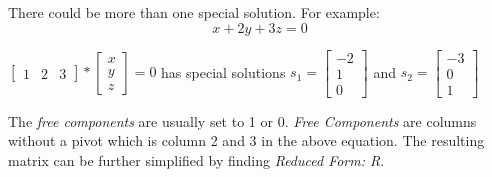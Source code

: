 \documentclass[10pt,a4paper]{article}
\begin{document}
There could be more than one special solution. For example:
$$x+2y+3z=0$$
\begin{center}
	$\begin{bmatrix}
		1 & 2 & 3
	\end{bmatrix} * \begin{bmatrix}
		x \\ 
		y \\
		z
	\end{bmatrix} = 0$ has special solutions $s_1 = \begin{bmatrix}
		-2 \\ 
		1 \\
		0
	\end{bmatrix}$ and $s_2 = \begin{bmatrix}
		-3 \\ 
		0 \\
		1
	\end{bmatrix}$
\end{center}
The \textit{free components} are usually set to 1 or 0. \textit{Free Components} are columns
without a pivot which is column 2 and 3 in the above equation. The resulting matrix can be further
simplified by finding \textit{Reduced Form: R}.
\end{document}

